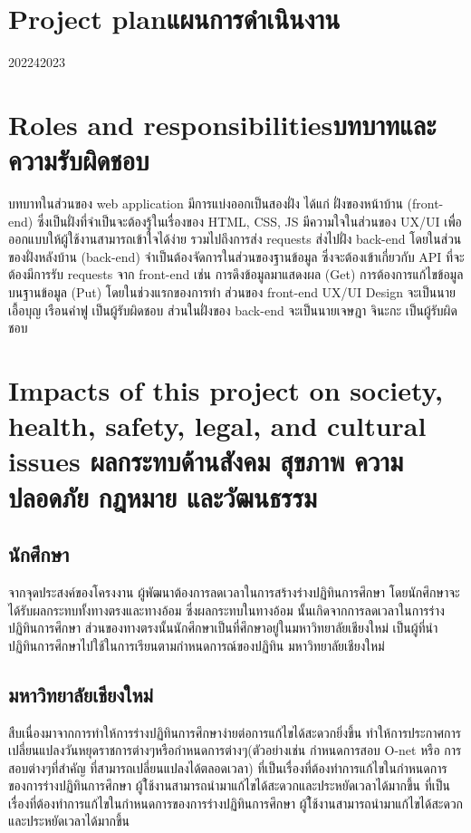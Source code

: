 \section{\ifenglish Project plan\else แผนการดำเนินงาน\fi}

\begin{plan}{1}{2022}{4}{2023}
\end{plan}

\section{\ifenglish Roles and responsibilities\else บทบาทและความรับผิดชอบ\fi}
บทบาทในส่วนของ web application มีการแบ่งออกเป็นสองฝั่ง ได้แก่ 
%
ฝั่งของหน้าบ้าน (front-end) ซึ่งเป็นฝั่งที่จำเป็นจะต้องรู้ในเรื่องของ HTML, CSS, JS มีความใจในส่วนของ UX/UI เพื่อออกแบบให้ผู้ใช้งานสามารถเข้าใจได้ง่าย 
%
รวมไปถึงการส่ง requests ส่งไปฝั่ง back-end โดยในส่วนของฝั่งหลังบ้าน (back-end) จำเป็นต้องจัดการในส่วนของฐานข้อมูล ซึ่งจะต้องเข้าเกี่ยวกับ API 
%
ที่จะต้องมีการรับ requests จาก front-end เช่น การดึงข้อมูลมาแสดงผล (Get) การต้องการแก้ไขข้อมูลบนฐานข้อมูล (Put)  
%
โดยในช่วงแรกของการทำ ส่วนของ front-end UX/UI Design จะเป็นนายเอื้อบุญ เรือนคำฟู เป็นผู้รับผิดชอบ  
%
ส่วนในฝั่งของ back-end จะเป็นนายเจษฎา จินะกะ เป็นผู้รับผิดชอบ
\section{\ifenglish%
Impacts of this project on society, health, safety, legal, and cultural issues
\else%
ผลกระทบด้านสังคม สุขภาพ ความปลอดภัย กฎหมาย และวัฒนธรรม
\fi}

\subsection{นักศึกษา}
    จากจุดประสงค์ของโครงงาน ผู้พัฒนาต้องการลดเวลาในการสร้างร่างปฏิทินการศึกษา โดยนักศึกษาจะได้รับผลกระทบทั้งทางตรงและทางอ้อม ซึ่งผลกระทบในทางอ้อม
%
นั้นเกิดจากการลดเวลาในการร่างปฏิทินการศึกษา ส่วนของทางตรงนั้นนักศึกษาเป็นที่ศึกษาอยู่ในมหาวิทยาลัยเชียงใหม่ เป็นผู้ที่นำปฏิทินการศึกษาไปใช้ในการเรียนตามกำหนดการณ์ของปฏิทิน มหาวิทยาลัยเชียงใหม่

\subsection{มหาวิทยาลัยเชียงใหม่}
    สืบเนื่องมาจากการทำให้การร่างปฏิทินการศึกษาง่ายต่อการแก้ไขได้สะดวกยิ่งขึ้น ทำให้การประกาศการเปลี่ยนแปลงวันหยุดราชการต่างๆหรือกำหนดการต่างๆ(ตัวอย่างเช่น กำหนดการสอบ O-net หรือ การสอบต่างๆที่สำคัญ ที่สามารถเปลี่ยนแปลงได้ตลอดเวลา)
ที่เป็นเรื่องที่ต้องทำการแก้ไขในกำหนดการของการร่างปฏิทินการศึกษา ผู้ใ้ช้งานสามารถนำมาแก้ไขได้สะดวกและประหยัดเวลาได้มากขึ้น 
%
ที่เป็นเรื่องที่ต้องทำการแก้ไขในกำหนดการของการร่างปฏิทินการศึกษา ผู้ใ้ช้งานสามารถนำมาแก้ไขได้สะดวกและประหยัดเวลาได้มากขึ้น 

